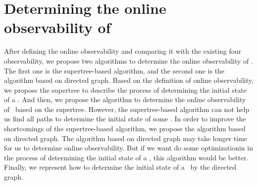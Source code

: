 \section{Determining the online observability of \BCNs}
\label{sec:deter}
After defining the online observability and comparing it with the existing four observability, we propose two algorithms to determine the online observability of \BCNs. The first one is the supertree-based algorithm, and the second one is the algorithm based on directed graph. Based on the definition of online observability, we propose the supertree to describe the process of determining the initial state of a \BCN. And then, we propose the algorithm to determine the online observability of \BCNs\ based on the supertree. However, the supertree-based algorithm can not help us find all paths to determine the initial state of some \BCNs. In order to improve the shortcomings of the supertree-based algorithm, we propose the algorithm based on directed graph. The algorithm based on directed graph may take longer time for us to determine online observability. But if we want do some optimizationin in the process of determining the initial state of a \BCN, this algorithm would be better. 
Finally, we represent how to determine the initial state of a \BCN\ by the directed graph.

